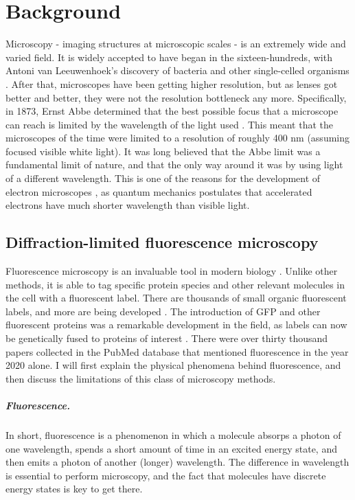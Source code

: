 \chapter{Background}


Microscopy - imaging structures at microscopic scales - is an extremely wide and varied field. It is widely accepted to have began in the sixteen-hundreds, with Antoni van Leeuwenhoek's discovery of bacteria and other single-celled organisms . After that, microscopes have been getting higher resolution, but as lenses got better and better, they were not the resolution bottleneck any more. Specifically, in 1873, Ernst Abbe determined that the best possible focus that a microscope can reach is limited by the wavelength of the light used . This meant that the microscopes of the time were limited to a resolution of roughly 400 nm (assuming focused visible white light). It was long believed that the Abbe limit was a fundamental limit of nature, and that the only way around it was by using light of a different wavelength. This is one of the reasons for the development of electron microscopes , as quantum mechanics postulates that accelerated electrons have much shorter wavelength than visible light. 

\section{Diffraction-limited fluorescence microscopy}

Fluorescence microscopy is an invaluable tool in modern biology \cite{Danial2016}. Unlike other methods, it is able to tag specific protein species and other relevant molecules in the cell with a fluorescent label. There are thousands of small organic fluorescent labels, and more are being developed \cite{Zhang2002, Resch-Genger2008}. The introduction of GFP and other fluorescent proteins was a remarkable development in the field, as labels can now be genetically fused to proteins of interest \cite{Shaner2005, Matlashov2020}. There were over thirty thousand papers collected in the PubMed database that mentioned fluorescence in the year 2020 alone. I will first explain the physical phenomena behind fluorescence, and then discuss the limitations of this class of microscopy methods. 

\paragraph{Fluorescence.} In short, fluorescence is a phenomenon in which a molecule absorps a photon of one wavelength, spends a short amount of time in an excited energy state, and then emits a photon of another (longer) wavelength. The difference in wavelength is essential to perform microscopy, and the fact that molecules have discrete energy states is key to get there.

